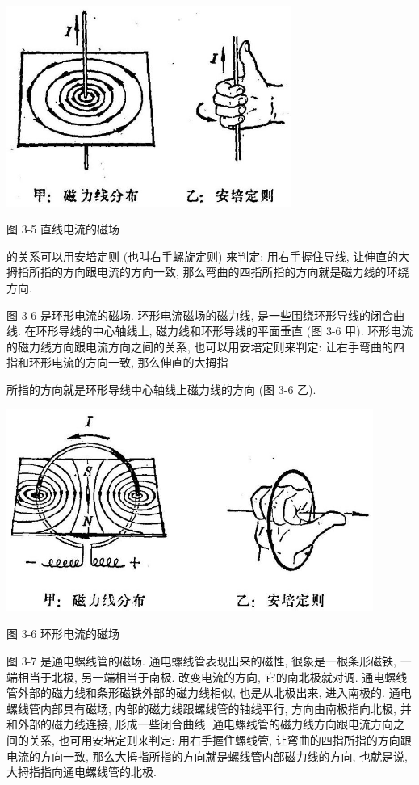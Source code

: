 \documentclass[10pt]{article}
\begin{document}
\begin{center}
\includegraphics[max width=0.7\textwidth]{images/01913056-1f15-74d8-9184-9aab52c9d66b_105_846010.jpg}
\end{center}

图 3-5 直线电流的磁场

的关系可以用安培定则 (也叫右手螺旋定则) 来判定: 用右手握住导线, 让伸直的大拇指所指的方向跟电流的方向一致, 那么弯曲的四指所指的方向就是磁力线的环绕方向.

图 3-6 是环形电流的磁场. 环形电流磁场的磁力线, 是一些围绕环形导线的闭合曲线. 在环形导线的中心轴线上, 磁力线和环形导线的平面垂直 (图 3-6 甲). 环形电流的磁力线方向跟电流方向之间的关系, 也可以用安培定则来判定: 让右手弯曲的四指和环形电流的方向一致, 那么伸直的大拇指

所指的方向就是环形导线中心轴线上磁力线的方向 (图 3-6 乙).

\begin{center}
\includegraphics[max width=0.9\textwidth]{images/01913056-1f15-74d8-9184-9aab52c9d66b_106_860177.jpg}
\end{center}

图 3-6 环形电流的磁场

图 3-7 是通电螺线管的磁场. 通电螺线管表现出来的磁性, 很象是一根条形磁铁, 一端相当于北极, 另一端相当于南极. 改变电流的方向, 它的南北极就对调. 通电螺线管外部的磁力线和条形磁铁外部的磁力线相似, 也是从北极出来, 进入南极的. 通电螺线管内部具有磁场, 内部的磁力线跟螺线管的轴线平行, 方向由南极指向北极, 并和外部的磁力线连接, 形成一些闭合曲线. 通电螺线管的磁力线方向跟电流方向之间的关系, 也可用安培定则来判定: 用右手握住螺线管, 让弯曲的四指所指的方向跟电流的方向一致, 那么大拇指所指的方向就是螺线管内部磁力线的方向, 也就是说, 大拇指指向通电螺线管的北极.
\end{document}
